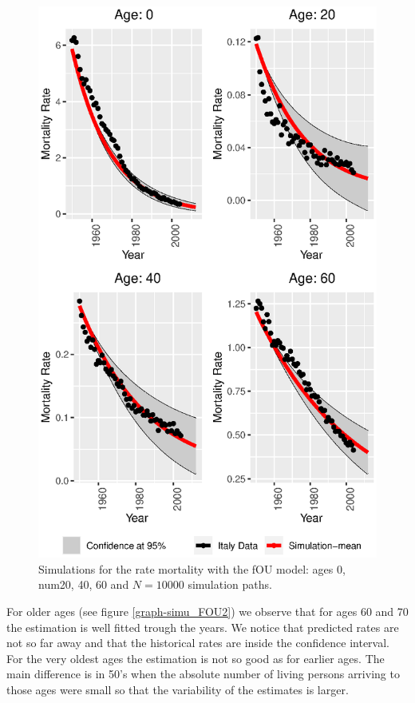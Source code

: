 \documentclass[smallextended]{svjour3}
\begin{document}
    \begin{figure}[H]
        \includegraphics{man_confidence_bands.eps}
        \caption{%
            Simulations for the rate mortality with the fOU model: ages
            \num{0}, num{20}, \num{40}, \num{60} and $N=\num{10000}$ simulation
            paths.
        }
        \label{graph-simu_FOU1_}
    \end{figure}

        For older ages (see figure \ref{graph-simu_FOU2}) we observe that for 
    ages \num{60} and \num{70} the estimation is well fitted trough the years. 
    We notice that predicted rates are not so far away and that the historical 
    rates are inside the confidence interval. For the very oldest ages the 
    estimation is not so good as for earlier ages. The main difference is in 
    \num{50}'s when the absolute number of
    living persons arriving to those ages were small so that the variability of 
    the estimates is larger. 
\end{document}
